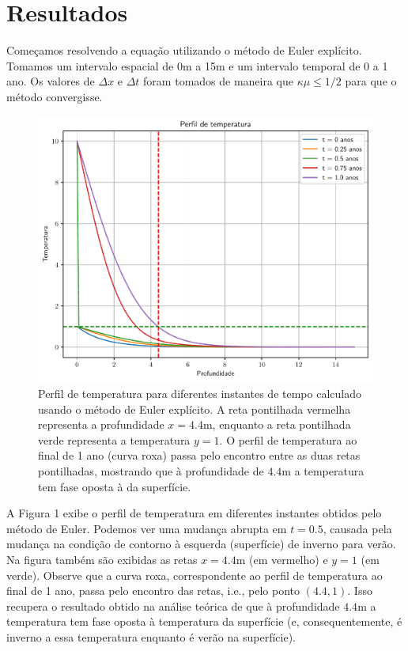 \documentclass[twocolumn,showpacs,%
  nofootinbib,aps,superscriptaddress,%
  eqsecnum,prd,notitlepage,showkeys,10pt]{revtex4-1} %
\renewcommand{\leq}{\leqslant}
\begin{document}
\section{Resultados}
%
	Começamos resolvendo a equação utilizando o método de Euler explícito.
	Tomamos um intervalo espacial de 0m a 15m e um intervalo temporal de 0 a 1 ano.
	Os valores de $\Delta x$ e $\Delta t$ foram tomados de maneira que $\kappa\mu \leq 1/2$
	para que o método convergisse.
	\begin{figure}[t]%
		\label{fig:exp-euler}
		\includegraphics[width=.45\textwidth]{Codes/exp-euler.pdf}
		\caption{Perfil de temperatura para diferentes instantes de tempo calculado usando
		o método de Euler explícito. A reta pontilhada
		vermelha representa a profundidade $x = 4.4$m, enquanto a reta pontilhada verde
		representa a temperatura $y=1$. O perfil de temperatura ao final de 1 ano (curva roxa)
		passa pelo encontro entre as duas retas pontilhadas, mostrando que à profundidade
		de $4.4$m a temperatura tem fase oposta à da superfície.}
	\end{figure}
	A Figura 1 exibe o perfil de temperatura em diferentes instantes
	obtidos pelo método de Euler.
	Podemos ver uma mudança abrupta em $t=0.5$, causada pela mudança na condição de contorno
	à esquerda (superfície) de inverno para verão. Na figura também são exibidas as retas 
	$x=4.4$m (em vermelho) e $y=1$ (em verde). Observe que a curva roxa, correspondente
	ao perfil de temperatura ao final de 1 ano, passa pelo encontro das retas, i.e.,
	pelo ponto $(4.4, 1)$. Isso recupera o resultado obtido na análise teórica de que
	à profundidade $4.4$m a temperatura tem fase oposta à temperatura da superfície
	(e, consequentemente, é inverno a essa temperatura enquanto é verão na superfície).
	
\end{document}
